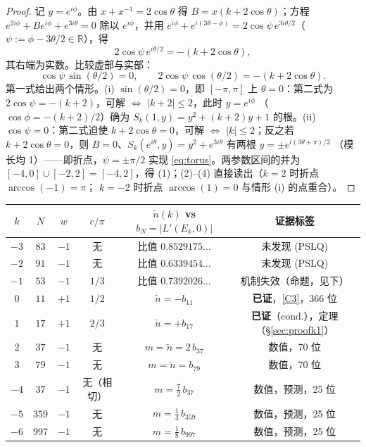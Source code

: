 \documentclass[11pt,a4paper]{ctexart}
\theoremstyle{remark}
\newcommand{\RR}{\mathbb{R}}
\begin{document}
\begin{proof}
记 $y=e^{i\phi}$。由 $x+x^{-1}=2\cos\theta$ 得 $B=x(k+2\cos\theta)$；方程
$e^{2i\phi}+Be^{i\phi}+e^{3i\theta}=0$ 除以 $e^{i\phi}$，并用
$e^{i\phi}+e^{i(3\theta-\phi)}=2\cos\psi\,e^{3i\theta/2}$（$\psi:=\phi-3\theta/2\in\RR$），得
\begin{equation}\label{eq:torus}
2\cos\psi\,e^{i\theta/2}=-(k+2\cos\theta),
\end{equation}
其右端为实数。比较虚部与实部：
\[
\cos\psi\,\sin(\theta/2)=0,\qquad 2\cos\psi\,\cos(\theta/2)=-(k+2\cos\theta).
\]
第一式给出两个情形。(i) $\sin(\theta/2)=0$，即 $[-\pi,\pi]$ 上 $\theta=0$：第二式为
$2\cos\psi=-(k+2)$，可解 $\Longleftrightarrow$ $|k+2|\le2$，此时 $y=e^{i\phi}$
（$\cos\phi=-(k+2)/2$）确为 $S_k(1,y)=y^2+(k+2)y+1$ 的根。(ii) $\cos\psi=0$：第二式迫使
$k+2\cos\theta=0$，可解 $\Longleftrightarrow$ $|k|\le2$；反之若 $k+2\cos\theta=0$，则
$B=0$、$S_k(e^{i\theta},y)=y^2+e^{3i\theta}$ 有两根 $y=\pm e^{i(3\theta+\pi)/2}$
（模长均 1）——即折点，$\psi=\pm\pi/2$ 实现 \eqref{eq:torus}。两参数区间的并为
$[-4,0]\cup[-2,2]=[-4,2]$，得 (1)；(2)--(4) 直接读出（$k=2$ 时折点 $\arccos(-1)=\pi$；
$k=-2$ 时折点 $\arccos(1)=0$ 与情形 (i) 的点重合）。
\end{proof}

\begin{center}\small
\begin{tabular}{cccccc}
\hline
$k$ & $N$ & $w$ & $c/\pi$ & $\tilde n(k)$ vs $b_N=|L'(E_k,0)|$ & 证据标签\\
\hline
$-3$ & $83$ & $-1$ & 无 & 比值 $0.8529175\ldots$ & 未发现 (PSLQ) \\
$-2$ & $91$ & $-1$ & 无 & 比值 $0.6339454\ldots$ & 未发现 (PSLQ) \\
$-1$ & $53$ & $-1$ & $1/3$ & 比值 $0.7392026\ldots$ & 机制失效（命题，见下）\\
$0$ & $11$ & $+1$ & $1/2$ & $\tilde n=-b_{11}$ & \textbf{已证}，\eqref{C3}，366 位 \\
$1$ & $17$ & $+1$ & $2/3$ & $\tilde n=+b_{17}$ & \textbf{已证}（cond.），定理（\S\ref{sec:proofk1}）\\
$2$ & $37$ & $-1$ & 无 & $m=\tilde n=2\,b_{37}$ & 数值，70 位 \\
$3$ & $79$ & $-1$ & 无 & $m=\tilde n=b_{79}$ & 数值，70 位 \\
$-4$ & $37$ & $-1$ & 无（相切） & $m=\frac72\,b_{37}$ & 数值，预测，25 位 \\
$-5$ & $359$ & $-1$ & 无 & $m=\frac14\,b_{359}$ & 数值，预测，25 位 \\
$-6$ & $997$ & $-1$ & 无 & $m=\frac18\,b_{997}$ & 数值，预测，25 位 \\
\hline
\end{tabular}
\end{center}
\end{document}
